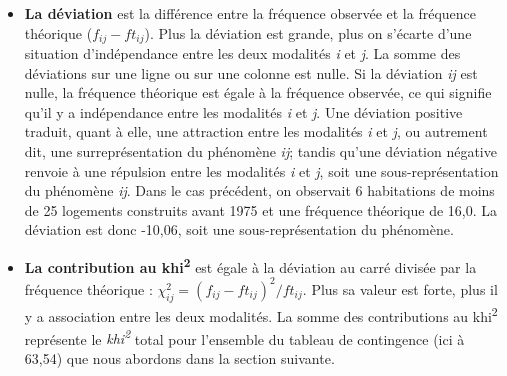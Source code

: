 \documentclass[
  11pt,
  french,
]{book}
\begin{document}
\begin{itemize}
\item
  \textbf{La déviation} est la différence entre la fréquence observée et la fréquence théorique (\(f_{ij}-ft_{ij}\)). Plus la déviation est grande, plus on s'écarte d'une situation d'indépendance entre les deux modalités \emph{i} et \emph{j}. La somme des déviations sur une ligne ou sur une colonne est nulle. Si la déviation \emph{ij} est nulle, la fréquence théorique est égale à la fréquence observée, ce qui signifie qu'il y a indépendance entre les modalités \emph{i} et \emph{j}. Une déviation positive traduit, quant à elle, une attraction entre les modalités \emph{i} et \emph{j}, ou autrement dit, une surreprésentation du phénomène \emph{ij}; tandis qu'une déviation négative renvoie à une répulsion entre les modalités \emph{i} et \emph{j}, soit une sous-représentation du phénomène \emph{ij}. Dans le cas précédent, on observait 6 habitations de moins de 25 logements construits avant 1975 et une fréquence théorique de 16,0. La déviation est donc -10,06, soit une sous-représentation du phénomène.
\item
  \textbf{La contribution au khi\textsuperscript{2}} est égale à la déviation au carré divisée par la fréquence théorique : \(\chi_{ij}^2 = (f_{ij}-ft_{ij})^2/ft_{ij}\). Plus sa valeur est forte, plus il y a association entre les deux modalités. La somme des contributions au khi\textsuperscript{2} représente le \emph{khi\textsuperscript{2}} total pour l'ensemble du tableau de contingence (ici à 63,54) que nous abordons dans la section suivante.
\end{itemize}
\end{document}
